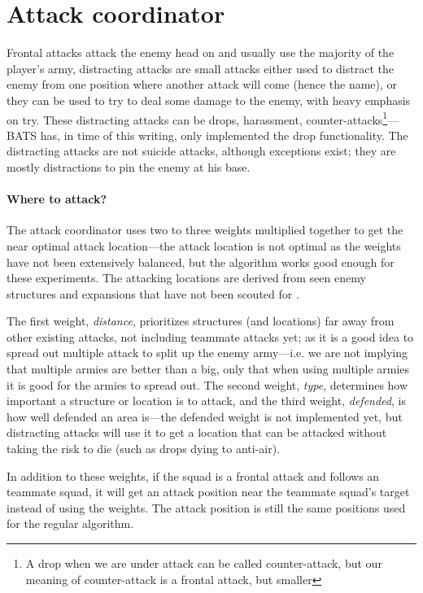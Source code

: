 \section{Attack coordinator}
\label{sec:attack_coordinator}
Frontal attacks attack the enemy head on and usually use the majority of the player’s army,
distracting attacks are small attacks either used to distract the enemy from one position where
another attack will come (hence the name), or they can be used to try to deal some damage to the
enemy, with heavy emphasis on try. These distracting attacks can be drops, harassment,
counter-attacks\footnote{A drop when we are under attack can be called counter-attack, but our
meaning of counter-attack is a frontal attack, but smaller}—BATS has, in time of this writing, only
implemented the drop functionality. The distracting attacks are not suicide attacks, although
exceptions exist; they are mostly distractions to pin the enemy at his base.

\paragraph{Where to attack?} The attack coordinator uses two to three weights multiplied together to
get the near optimal attack location—the attack location is not optimal as the weights have
not been extensively balanced, but the algorithm works good enough for these experiments. The
attacking locations are derived from seen enemy structures and expansions that have not been scouted
for \attackCoordinatorExpansionNotCheckedTime.

The first weight, \emph{distance}, prioritizes structures (and locations) far away from other
existing attacks, not including teammate attacks yet; as it is a good idea to spread out multiple
attack to split up the enemy army—i.e. we are not implying that multiple armies are better than a
big, only that when using multiple armies it is good for the armies to spread out. The second
weight, \emph{type}, determines how important a structure or location is to attack, and the third
weight, \emph{defended}, is how well defended an area is—the defended weight is not implemented yet,
but distracting attacks will use it to get a location that can be attacked without taking the risk
to die (such as drops dying to anti-air).

In addition to these weights, if the squad is a frontal attack and follows an teammate squad, it will
get an attack position near the teammate squad's target instead of using the weights. The attack
position is still the same positions used for the regular algorithm.

